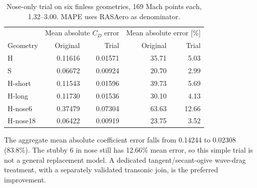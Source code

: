 \documentclass[oneside,openany]{amsdtx}
\begin{document}
\begin{table}[H]\centering\small\renewcommand{\arraystretch}{1.12}
\caption{Nose-only trial on six finless geometries, 169 Mach points each, 1.32--3.00. MAPE uses RASAero as denominator.}\label{tab:nosetrial}
\begin{tabular}{@{}lrrrr@{}}\toprule
 & \multicolumn{2}{c}{Mean absolute $C_D$ error} & \multicolumn{2}{c}{Mean absolute error [\%]}\\
Geometry & Original & Trial & Original & Trial\\\midrule


H & 0.11616 & 0.01571 & 35.71 & 5.03\\

S & 0.06672 & 0.00924 & 20.70 & 2.99\\

H-short & 0.11543 & 0.01596 & 39.73 & 5.69\\

H-long & 0.11730 & 0.01536 & 30.10 & 4.13\\

H-nose6 & 0.37479 & 0.07304 & 63.63 & 12.66\\

H-nose18 & 0.06422 & 0.00919 & 23.75 & 3.52\\


\bottomrule\end{tabular}\end{table}
The aggregate mean absolute coefficient error falls from 0.14244 to 0.02308 (83.8\%). The stubby 6 in nose still has 12.66\% mean error, so this simple trial is not a general replacement model. A dedicated tangent/secant-ogive wave-drag treatment, with a separately validated transonic join, is the preferred improvement.


\clearpage
\end{document}

